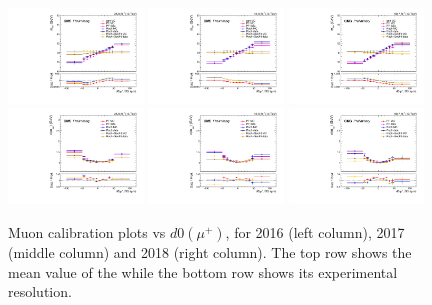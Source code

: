 \begin{figure}[!htb]
      \centering
      \captionsetup{justification=justified}
      \includegraphics[width=0.32\textwidth]{pics/muon_corr/muon_cal/2016/muP_d0_rebin_summary_mean.pdf}
      \includegraphics[width=0.32\textwidth]{pics/muon_corr/muon_cal/2017/muP_d0_rebin_summary_mean.pdf}
      \includegraphics[width=0.32\textwidth]{pics/muon_corr/muon_cal/2018/muP_d0_rebin_summary_mean.pdf}
      \includegraphics[width=0.32\textwidth]{pics/muon_corr/muon_cal/2016/muP_d0_rebin_summary_reso.pdf}
      \includegraphics[width=0.32\textwidth]{pics/muon_corr/muon_cal/2017/muP_d0_rebin_summary_reso.pdf}
      \includegraphics[width=0.32\textwidth]{pics/muon_corr/muon_cal/2018/muP_d0_rebin_summary_reso.pdf}
      \caption{Muon calibration plots vs $d0(\mu^{+})$, for 2016 (left column), 2017 (middle column) and 2018 (right column).
               The top row shows the mean value of the \mmm while the bottom row shows its experimental resolution.}
      \label{fig:mucal_muP_d0}
\end{figure}


